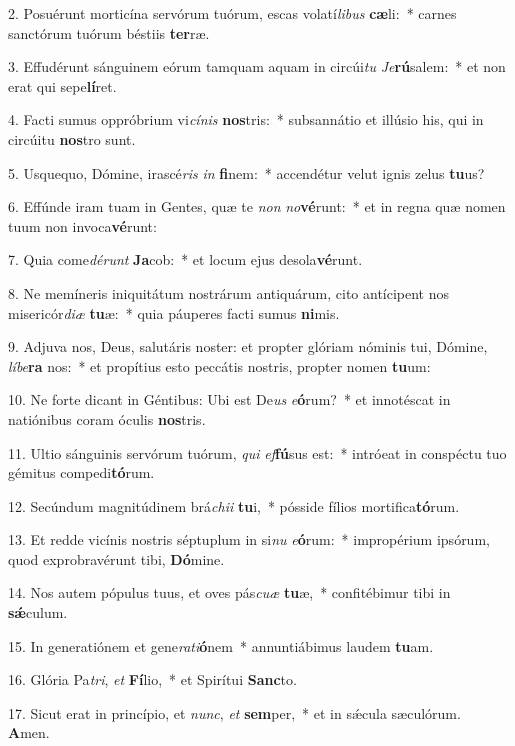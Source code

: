 2. Posuérunt morticína servórum tuórum, escas volatí\textit{li}\textit{bus} \textbf{cæ}li:~*  carnes sanctórum tuórum béstiis \textbf{ter}ræ.\

3. Effudérunt sánguinem eórum tamquam aquam in circúi\textit{tu} \textit{Je}\textbf{rú}salem:~*  et non erat qui sepe\textbf{lí}ret.\

4. Facti sumus oppróbrium vi\textit{cí}\textit{nis} \textbf{nos}tris:~*  subsannátio et illúsio his, qui in circúitu \textbf{nos}tro sunt.\

5. Usquequo, Dómine, irascé\textit{ris} \textit{in} \textbf{fi}nem:~*  accendétur velut ignis zelus \textbf{tu}us?\

6. Effúnde iram tuam in Gentes, quæ te \textit{non} \textit{no}\textbf{vé}runt:~*  et in regna quæ nomen tuum non invoca\textbf{vé}runt:\

7. Quia come\textit{dé}\textit{runt} \textbf{Ja}cob:~*  et locum ejus desola\textbf{vé}runt.\

8. Ne memíneris iniquitátum nostrárum antiquárum, cito antícipent nos misericór\textit{di}\textit{æ} \textbf{tu}æ:~*  quia páuperes facti sumus \textbf{ni}mis.\

9. Adjuva nos, Deus, salutáris noster: et propter glóriam nóminis tui, Dómine, \textit{lí}\textit{be}\textbf{ra} nos:~*  et propítius esto peccátis nostris, propter nomen \textbf{tu}um:\

10. Ne forte dicant in Géntibus: Ubi est De\textit{us} \textit{e}\textbf{ó}rum?~*  et innotéscat in natiónibus coram óculis \textbf{nos}tris.\

11. Ultio sánguinis servórum tuórum, \textit{qui} \textit{ef}\textbf{fú}sus est:~*  intróeat in conspéctu tuo gémitus compedi\textbf{tó}rum.\

12. Secúndum magnitúdinem brá\textit{chi}\textit{i} \textbf{tu}i,~*  pósside fílios mortifica\textbf{tó}rum.\

13. Et redde vicínis nostris séptuplum in si\textit{nu} \textit{e}\textbf{ó}rum:~*  impropérium ipsórum, quod exprobravérunt tibi, \textbf{Dó}mine.\

14. Nos autem pópulus tuus, et oves pás\textit{cu}\textit{æ} \textbf{tu}æ,~*  confitébimur tibi in \textbf{sǽ}culum.\

15. In generatiónem et gene\textit{ra}\textit{ti}\textbf{ó}nem~*  annuntiábimus laudem \textbf{tu}am.\

16. Glória Pa\textit{tri}, \textit{et} \textbf{Fí}lio,~*  et Spirítui \textbf{Sanc}to.\

17. Sicut erat in princípio, et \textit{nunc}, \textit{et} \textbf{sem}per,~*  et in sǽcula sæculórum. \textbf{A}men.\

